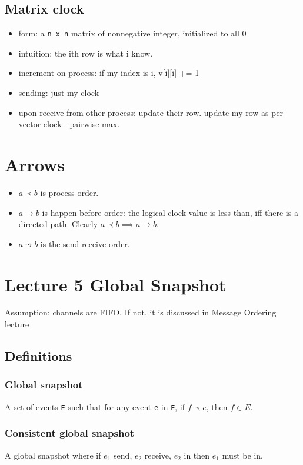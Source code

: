 \documentclass[11pt]{article}
\begin{document}
\subsection{Matrix clock}
\label{sec:org0c212ff}
\begin{itemize}
\item form: a \texttt{n x n} matrix of nonnegative integer, initialized to all 0
\item intuition: the ith row is what i know.
\item increment on process: if my index is i, v[i][i] += 1
\item sending: just my clock
\item upon receive from other process: update their row. update my row as per vector
clock - pairwise max.
\end{itemize}
\section{Arrows}
\label{sec:org26e59f6}
\begin{itemize}
\item \(a\prec b\) is process order.
\item \(a\to b\) is happen-before order: the logical clock value is less than, iff
there is a directed path. Clearly \(a\prec b\implies a\to b\).
\item \(a\leadsto b\) is the send-receive order.
\end{itemize}
\section{Lecture 5 Global Snapshot}
\label{sec:org6f00549}
Assumption: channels are FIFO. If not, it is discussed in Message Ordering
lecture
\subsection{Definitions}
\label{sec:orgeb6c532}
\subsubsection{Global snapshot}
\label{sec:org53d0422}
A set of events \texttt{E} such that for any event \texttt{e} in \texttt{E}, if \(f\prec e\), then
\(f\in E\).
\subsubsection{Consistent global snapshot}
\label{sec:org13f7032}
A global snapshot where if \(e_1\) send, \(e_2\) receive, \(e_2\) in then \(e_1\) must be in.
\end{document}
